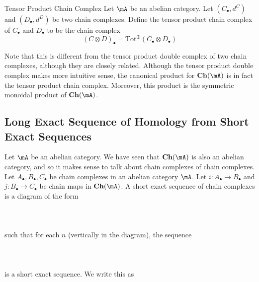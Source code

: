 \documentclass[a4paper]{article}
\begin{document}
\begin{defn}{Tensor Product Chain Complex}{} Let $\mA$ be an abelian category. Let $(C_\bullet,d^C)$ and $(D_\bullet,d^D)$ be two chain complexes. Define the tensor product chain complex of $C_\bullet$ and $D_\bullet$ to be the chain complex $$(C\otimes D)_\bullet=\text{Tot}^\oplus(C_\bullet\otimes D_\bullet)$$
\end{defn}

Note that this is different from the tensor product double complex of two chain complexes, although they are closely related. Although the tensor product double complex makes more intuitive sense, the canonical product for $\bold{Ch}(\mA)$ is in fact the tensor product chain complex. Moreover, this product is the symmetric monoidal product of $\bold{Ch}(\mA)$. 

\subsection{Long Exact Sequence of Homology from Short Exact Sequences}
Let $\mA$ be an abelian category. We have seen that $\bold{Ch}(\mA)$ is also an abelian category, and so it makes sense to talk about chain complexes of chain complexes. Let $A_\bullet,B_\bullet,C_\bullet$ be chain complexes in an abelian category $\mA$. Let $i:A_\bullet\to B_\bullet$ and $j:B_\bullet\to C_\bullet$ be chain maps in $\bold{Ch}(\mA)$. A short exact sequence of chain complexes is a diagram of the form \\~\\
\\~\\
such that for each $n$ (vertically in the diagram), the sequence \\~\\
\\~\\ is a short exact sequence. We write this as \\~\\
\end{document}

